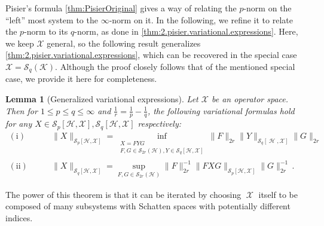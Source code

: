 \documentclass[11pt]{article}
\newcommand{\1}{\ensuremath{\mathbbm{1}}}
\theoremstyle{newdefinition}
\theoremstyle{newplain}
\newtheorem{lemma}[definition]{Lemma}
\theoremstyle{myplain}
\DeclareMathOperator{\cH}{\mathcal{H}}
\DeclareMathOperator{\cX}{\mathcal{X}}
\begin{document}
Pisier's formula \cref{thm:PisierOriginal} gives a way of relating the $p$-norm on the ``left'' most system to the $\infty$-norm on it. In the following, we refine it to relate the $p$-norm to its $q$-norm, as done in \cref{thm:2.pisier.variational.expressions}. 
Here, we keep $\mathcal{X}$ general, so the following result generalizes \cref{thm:2.pisier.variational.expressions}, which can be recovered in the special case $\mathcal{X}=\mathcal{S}_q(\mathcal{K})$. Although the proof closely follows that of the mentioned special case, we provide it here for completeness.


\begin{lemma}[Generalized variational expressions]
Let $\mathcal{X}$ be an operator space. Then for $1\leq p\leq q\leq \infty$ and $\frac{1}{r}=\frac{1}{p}-\frac{1}{q}$, the following variational formulas hold for any $X\in \mathcal{S}_p[\mathcal{H},\mathcal{X}],\mathcal{S}_q[\mathcal{H},\mathcal{X}]$ respectively:
\begin{align}
\operatorname{(i)}\qquad&\|X\|_{\mathcal{S}_p[\mathcal{H},\mathcal{X}]}=\inf_{\substack{X=FYG\\F,G\in \mathcal{S}_{2r}(\mathcal{H}), Y\in\mathcal{S}_q[\mathcal{H}, \mathcal{X}] }} \|F\|_{2r} \|Y\|_{\mathcal{S}_q[\cH,\mathcal{X}]}\|G\|_{2r}\\
\operatorname{(ii)}\qquad &\|X\|_{\mathcal{S}_q[\mathcal{H},\mathcal{X}]} = \sup_{F,G\in \mathcal{S}_{2r}(\mathcal{H})}\|F\|_{2r}^{-1}\|FXG\|_{\mathcal{S}_p[\mathcal{H},\mathcal{X}]}\|G\|_{2r}^{-1}\,.
\end{align} \label{thm:VariationalSpOperatorspace}
\end{lemma}
\noindent The power of this theorem is that it can be iterated by choosing $\cX$ itself to be composed of many subsystems with Schatten spaces with potentially different indices.
\end{document}
